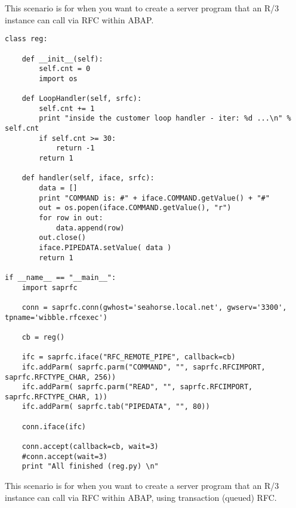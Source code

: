 \documentclass{howto}
\begin{document}


This scenario is for when you want to create a server program that an R/3 instance can call via RFC within ABAP.


\begin{verbatim}
class reg:

	def __init__(self):
		self.cnt = 0
		import os

	def LoopHandler(self, srfc):
		self.cnt += 1
		print "inside the customer loop handler - iter: %d ...\n" % self.cnt
		if self.cnt >= 30:
			return -1
		return 1

	def handler(self, iface, srfc):
		data = []
		print "COMMAND is: #" + iface.COMMAND.getValue() + "#"
		out = os.popen(iface.COMMAND.getValue(), "r")
		for row in out:
			data.append(row)
		out.close()
		iface.PIPEDATA.setValue( data )
		return 1

if __name__ == "__main__":
	import saprfc

	conn = saprfc.conn(gwhost='seahorse.local.net', gwserv='3300', tpname='wibble.rfcexec')

	cb = reg()

	ifc = saprfc.iface("RFC_REMOTE_PIPE", callback=cb)
	ifc.addParm( saprfc.parm("COMMAND", "", saprfc.RFCIMPORT, saprfc.RFCTYPE_CHAR, 256))
	ifc.addParm( saprfc.parm("READ", "", saprfc.RFCIMPORT, saprfc.RFCTYPE_CHAR, 1))
	ifc.addParm( saprfc.tab("PIPEDATA", "", 80))

	conn.iface(ifc)

	conn.accept(callback=cb, wait=3)
	#conn.accept(wait=3)
	print "All finished (reg.py) \n"

\end{verbatim}





This scenario is for when you want to create a server program that an R/3 instance can call via RFC within ABAP, using transaction (queued) RFC.
\end{document}
